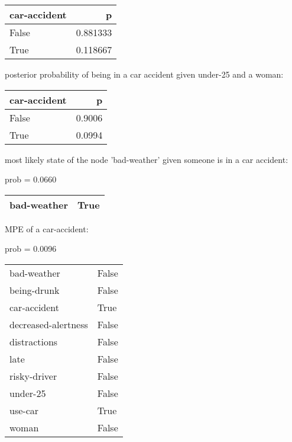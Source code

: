 
\vfill\vfill
\begin{tabular}{lr}
\toprule
 car-accident &        p \\
\midrule
        False & 0.881333 \\
         True & 0.118667 \\
\bottomrule
\end{tabular}

posterior probability of being in a car accident given under-25 and a woman:
\vfill
\begin{tabular}{lr}
\toprule
 car-accident &      p \\
\midrule
        False & 0.9006 \\
         True & 0.0994 \\
\bottomrule
\end{tabular}

\vfill\vfill

\vfill\vfill

most likely state of the node 'bad-weather' given someone is in a car accident:

prob = 0.0660
\vfill
\begin{tabular}{ll}
\toprule
bad-weather &  True \\
\bottomrule
\end{tabular}

\vfill\vfill

\vfill\vfill
MPE of a car-accident:

prob = 0.0096
\vfill
\begin{tabular}{ll}
\toprule
bad-weather         &  False \\
being-drunk         &  False \\
car-accident        &   True \\
decreased-alertness &  False \\
distractions        &  False \\
late                &  False \\
risky-driver        &  False \\
under-25            &  False \\
use-car             &   True \\
woman               &  False \\
\bottomrule
\end{tabular}

\vfill\vfill

\vfill\vfill
